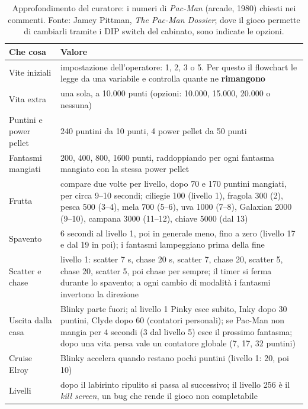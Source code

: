 \begin{table}[htbp]
  \centering
  \caption{Approfondimento del curatore: i numeri di \emph{Pac-Man} (arcade,
  1980) chiesti nei commenti. Fonte: Jamey Pittman, \emph{The Pac-Man
  Dossier}; dove il gioco permette di cambiarli tramite i DIP switch del
  cabinato, sono indicate le opzioni.}
  \label{rv:t4:tab:numeri}
  \small
  \begin{tabular}{@{}p{3.0cm}p{9.0cm}@{}}
    \toprule
    \textbf{Che cosa} & \textbf{Valore} \\
    \midrule
    Vite iniziali & impostazione dell'operatore: 1, 2, 3 o 5. Per questo il
      flowchart le legge da una variabile e controlla quante ne
      \textbf{rimangono} \\
    \addlinespace
    Vita extra & una sola, a 10.000 punti (opzioni: 10.000, 15.000, 20.000 o
      nessuna) \\
    \addlinespace
    Puntini e power pellet & 240 puntini da 10 punti, 4 power pellet da 50
      punti \\
    \addlinespace
    Fantasmi mangiati & 200, 400, 800, 1600 punti, raddoppiando per ogni
      fantasma mangiato con la stessa power pellet \\
    \addlinespace
    Frutta & compare due volte per livello, dopo 70 e 170 puntini mangiati,
      per circa 9--10 secondi; ciliegie 100 (livello 1), fragola 300 (2),
      pesca 500 (3--4), mela 700 (5--6), uva 1000 (7--8), Galaxian 2000
      (9--10), campana 3000 (11--12), chiave 5000 (dal 13) \\
    \addlinespace
    Spavento & 6 secondi al livello 1, poi in generale meno, fino a zero
      (livello 17 e dal 19 in poi); i fantasmi lampeggiano prima della fine \\
    \addlinespace
    Scatter e chase & livello 1: scatter 7 s, chase 20 s, scatter 7, chase
      20, scatter 5, chase 20, scatter 5, poi chase per sempre; il timer si
      ferma durante lo spavento; a ogni cambio di modalità i fantasmi
      invertono la direzione \\
    \addlinespace
    Uscita dalla casa & Blinky parte fuori; al livello 1 Pinky esce subito,
      Inky dopo 30 puntini, Clyde dopo 60 (contatori personali); se Pac-Man
      non mangia per 4 secondi (3 dal livello 5) esce il prossimo fantasma;
      dopo una vita persa vale un contatore globale (7, 17, 32 puntini) \\
    \addlinespace
    Cruise Elroy & Blinky accelera quando restano pochi puntini (livello 1:
      20, poi 10) \\
    \addlinespace
    Livelli & dopo il labirinto ripulito si passa al successivo; il livello
      256 è il \emph{kill screen}, un bug che rende il gioco non
      completabile \\
    \bottomrule
  \end{tabular}
\end{table}

